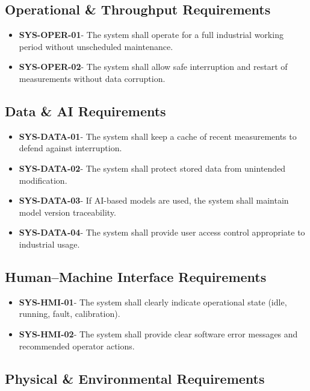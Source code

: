\documentclass[a4paper, 12pt, english]{article}
\begin{document}
\subsection{Operational \& Throughput Requirements}

\begin{itemize}
    \item \textbf{SYS-OPER-01}- The system shall operate for a full industrial working period without unscheduled maintenance.
    \item \textbf{SYS-OPER-02}- The system shall allow safe interruption and restart of measurements without data corruption.
\end{itemize}

\subsection{Data \& AI Requirements}

\begin{itemize}
    \item \textbf{SYS-DATA-01}- The system shall keep a cache of recent measurements to defend against interruption.
    \item \textbf{SYS-DATA-02}- The system shall protect stored data from unintended modification.
    \item \textbf{SYS-DATA-03}- If AI-based models are used, the system shall maintain model version traceability.
    \item \textbf{SYS-DATA-04}- The system shall provide user access control appropriate to industrial usage.
\end{itemize}

\subsection{Human--Machine Interface Requirements}

\begin{itemize}
    \item \textbf{SYS-HMI-01}- The system shall clearly indicate operational state (idle, running, fault, calibration).
    \item \textbf{SYS-HMI-02}- The system shall provide clear software error messages and recommended operator actions.
\end{itemize}

\subsection{Physical \& Environmental Requirements}
\end{document}
